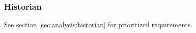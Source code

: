 \subsubsection*{Historian}
See section \ref{sec:analysis:historian} for prioritized requirements.


